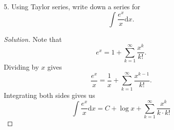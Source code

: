 \documentclass[12pt]{article}
\newcommand{\md}[1]{\left\lvert #1 \right\lvert}
\theoremstyle{definition}
\newenvironment{soln}{\begin{proof}[Solution]}{\end{proof}}
\begin{document}
\begin{itemize}
\begin{soln}
\[\begin{WithArrows}[displaystyle]
				\md{\dfrac{x^{n+1}}{(n + 1)!}} &= \md{\dfrac{x^n}{n!}}\md{\dfrac{x}{n+1}} \Arrow{$n + 1 > n > N$}\\
				&\le \md{\dfrac{x^n}{n!}}\md{\dfrac{x}{N}} \Arrow{$N > 2\md{x}$}\\
				&\le \dfrac{1}{2}\md{\dfrac{x^n}{n!}}.
			\end{WithArrows}\]
			Thus, we can repeatedly use the above to get:
			\begin{equation*} 
				\md{\dfrac{x^{n+1}}{(n + 1)!}} \le \dfrac{1}{2}\md{\dfrac{x^n}{n!}} \le \cdots \le \dfrac{1}{2^{n + 1 - N}}\md{\dfrac{x^N}{N!}}.
			\end{equation*}
			Let $s_n(x) = \displaystyle\sum_{k = 0}^{n}\dfrac{x^k}{k!}.$


			Now, given $m > n > N,$ we have
			\begin{align*} 
				\md{s_m(x) - s_n(x)} &= \md{\sum_{k = n+1}^{m}\dfrac{x^k}{k!}}\\
				&\le \sum_{k = n + 1}^{m}\md{\dfrac{x^k}{k!}}\\
				&= \md{\dfrac{x^{n + 1}}{(n + 1)!}} + \cdots + \md{\dfrac{x^m}{m!}}\\
				&\le \dfrac{\md{x}^N}{N!}\left(\dfrac{1}{2} + \cdots + \dfrac{1}{2^{m-n}}\right)\\
				&{\color{myupdatecolor}\le} \dfrac{\md{x}^N}{N!}.
			\end{align*}
			Note that given any $\epsilon > 0,$ we can pick $N \in \mathbb{N}$ such that $\dfrac{\md{x}^N}{N!} < \epsilon.$ Conclude Cauchy-ness.
		\end{soln}
		\newpage
		\item[5.] Using Taylor series, write down a series for 
		\begin{equation*} 
			\int \dfrac{e^x}{x} {\mathrm{d}}x.
		\end{equation*}
		\begin{soln}
			Note that
			\begin{equation*} 
				e^x = 1 + \sum_{k = 1}^{\infty}\dfrac{x^k}{k!}.
			\end{equation*}
			Dividing by $x$ gives
			\begin{equation*} 
				\dfrac{e^x}{x} = \dfrac{1}{x} + \sum_{k = 1}^{\infty}\dfrac{x^{k-1}}{k!}.
			\end{equation*}
			Integrating both sides gives us
			\begin{equation*} 
				\int \dfrac{e^x}{x} {\mathrm{d}}x = C + \log x + \sum_{k = 1}^{\infty}\dfrac{x^{k}}{k\cdot k!}
			\end{equation*}
		\end{soln}
	\end{itemize}	
\end{document}
